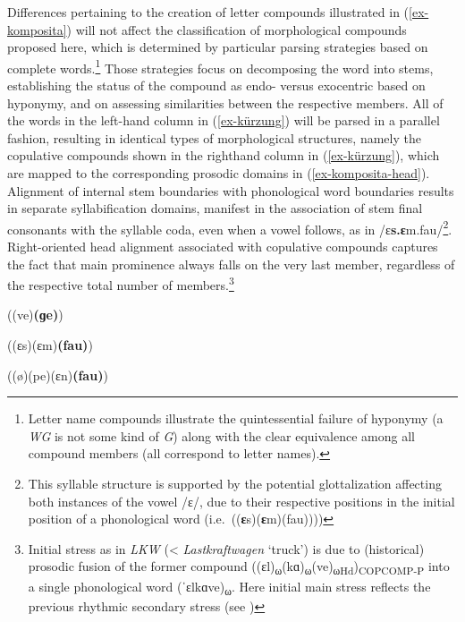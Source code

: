 \documentclass[output=paper
 ,nobabel
 ,draftmode
 ,colorlinks, citecolor=brown
]{langscibook}
\begin{document}
\noindent
Differences pertaining to the creation of letter compounds illustrated in (\ref{ex-komposita}) will not affect the classification of morphological compounds proposed here, which is determined by particular parsing strategies based on complete words.\footnote{Letter name compounds illustrate the quintessential failure of hyponymy (a \emph{WG} is not some kind of \emph{G}) along with the clear equivalence among all compound members (all correspond to letter names).} Those strategies focus on decomposing the word into stems, establishing the status of the compound as endo- versus exocentric based on hyponymy, and on assessing similarities between the respective members. All of the words in the left-hand column in (\ref{ex-kürzung}) will be parsed in a parallel fashion, resulting in identical types of morphological structures, namely the copulative compounds shown in the righthand column in (\ref{ex-kürzung}), which are mapped to the corresponding prosodic domains in (\ref{ex-komposita-head}). Alignment of internal stem boundaries with phonological word boundaries results in separate syllabification domains, manifest in the association of stem final consonants with the syllable coda, even when a vowel follows, as in /ɛ\textbf{s.ɛ}m.fau/\footnote{This syllable structure is supported by the potential glottalization affecting both instances of the vowel /ɛ/, due to their respective positions in the initial position of a phonological word (i.e.\ ((\textbf{ɛ}s)(\textbf{ɛ}m)(fau))))}. 
Right-oriented head alignment associated with copulative compounds captures the fact that main prominence always falls on the very last member, regardless of the respective total number of members.\footnote{Initial stress as in \emph{LKW} (< \emph{Lastkraftwagen} `truck') is due to (historical) prosodic fusion of the former compound ((ɛl)\textsubscript{ω}(kɑ)\textsubscript{ω}(ve)\textsubscript{ωHd})\textsubscript{COPCOMP-P} into a single phonological word (ˈɛlkɑ\textsecstress ve)\textsubscript{ω}. Here initial main stress reflects the previous rhythmic secondary stress (see \citet[102]{Raffelsiefen2021})}


\eal\label{ex-komposita-head}
\ex\label{ex-wohngemeinschaft-head}
((ve)\textbf{(ɡe)})   		

\ex ((ɛs)(ɛm)\textbf{(fau)})  		

\ex ((ø)(pe)(ɛn)\textbf{(fau)})   		
\end{document}
